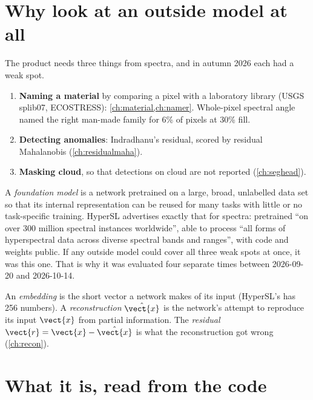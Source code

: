 \section{Why look at an outside model at all}\label{sec:hslwhat:why}

The product needs three things from spectra, and in autumn 2026 each had a weak spot.
\begin{enumerate}
\item \textbf{Naming a material} by comparing a pixel with a laboratory library (USGS splib07, ECOSTRESS):
\cref{ch:material,ch:namer}. Whole-pixel spectral angle named the right man-made family for 6\% of pixels at 30\%
fill\tbrk{}.
\item \textbf{Detecting anomalies}: Indradhanu's residual, scored by residual Mahalanobis (\cref{ch:residualmaha}).
\item \textbf{Masking cloud}, so that detections on cloud are not reported (\cref{ch:seghead}).
\end{enumerate}
A \emph{foundation model} is a network pretrained on a large, broad, unlabelled data set so
that its internal representation can be reused for many tasks with little or no task-specific training. HyperSL
\citep{kong2025hypersl} advertises exactly that for spectra: pretrained ``on over 300 million spectral instances
worldwide'', able to process ``all forms of hyperspectral data across diverse spectral bands and ranges'', with code
and weights public. If any outside model could cover all three weak spots at once, it was this one. That is why it
was evaluated four separate times between 2026-09-20 and 2026-10-14.

\begin{definition}
An \emph{embedding} is the short vector a network makes of its input (HyperSL's has 256 numbers).
A \emph{reconstruction} $\hat{\vect{x}}$ is the network's attempt to reproduce its input $\vect{x}$ from partial
information. The \emph{residual} $\vect{r}=\vect{x}-\hat{\vect{x}}$ is what the reconstruction got wrong
(\cref{ch:recon}).
\end{definition}

\section{What it is, read from the code}\label{sec:hslwhat:arch}

